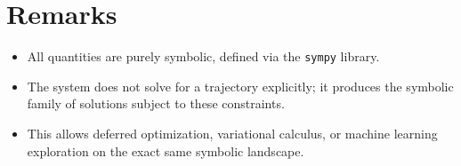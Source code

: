 \documentclass{article}
\begin{document}
\section*{Remarks}
\begin{itemize}
    \item All quantities are purely symbolic, defined via the \texttt{sympy} library.
    \item The system does not solve for a trajectory explicitly; it produces the symbolic family of solutions subject to these constraints.
    \item This allows deferred optimization, variational calculus, or machine learning exploration on the exact same symbolic landscape.
\end{itemize}
\end{document}
